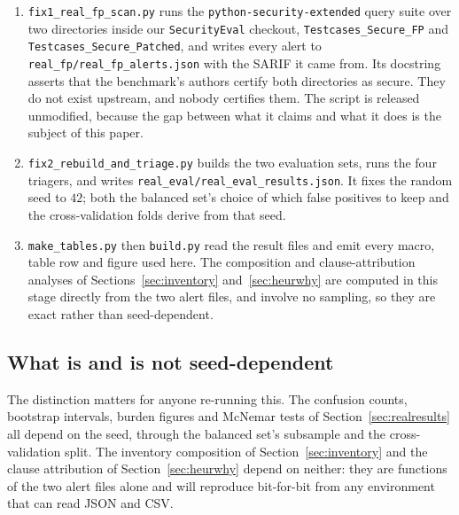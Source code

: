 \documentclass[journal]{IEEEtran}
\theoremstyle{definition}
\begin{document}
\begin{enumerate}
\item \texttt{fix1\_\allowbreak{}real\_\allowbreak{}fp\_\allowbreak{}scan.\allowbreak{}py} runs the
\texttt{python-\allowbreak{}security-\allowbreak{}extended} query suite over two directories inside our
\texttt{SecurityEval} checkout, \texttt{Testcases\_\allowbreak{}Secure\_\allowbreak{}FP} and
\texttt{Testcases\_\allowbreak{}Secure\_\allowbreak{}Patched}, and writes every alert to
\texttt{real\_\allowbreak{}fp/\allowbreak{}real\_\allowbreak{}fp\_\allowbreak{}alerts.\allowbreak{}json} with the SARIF it came from. Its
docstring asserts that the benchmark's authors certify both directories as
secure. They do not exist upstream, and nobody certifies them. The script is
released unmodified, because the gap between what it claims and what it does is
the subject of this paper.

\item \texttt{fix2\_\allowbreak{}rebuild\_\allowbreak{}and\_\allowbreak{}triage.\allowbreak{}py} builds the two evaluation sets,
runs the four triagers, and writes
\texttt{real\_\allowbreak{}eval/\allowbreak{}real\_\allowbreak{}eval\_\allowbreak{}results.\allowbreak{}json}. It fixes the random seed to
\(42\); both the balanced set's choice of which false positives to keep and the
cross-validation folds derive from that seed.

\item \texttt{make\_tables.py} then \texttt{build.py} read the result files and
emit every macro, table row and figure used here. The composition and
clause-attribution analyses of Sections~\ref{sec:inventory}
and~\ref{sec:heurwhy} are computed in this stage directly from the two alert
files, and involve no sampling, so they are exact rather than seed-dependent.
\end{enumerate}

\subsection{What is and is not seed-dependent}

The distinction matters for anyone re-running this. The confusion counts,
bootstrap intervals, burden figures and McNemar tests of
Section~\ref{sec:realresults} all depend on the seed, through the balanced
set's subsample and the cross-validation split. The inventory composition of
Section~\ref{sec:inventory} and the clause attribution of
Section~\ref{sec:heurwhy} depend on neither: they are functions of the two
alert files alone and will reproduce bit-for-bit from any environment that can
read JSON and CSV.
\end{document}
